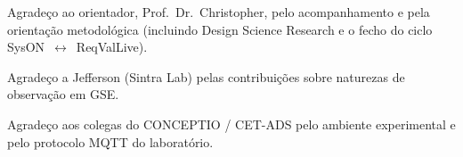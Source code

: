 Agradeço ao orientador, Prof.~Dr.~Christopher, pelo acompanhamento e pela
orientação metodológica (incluindo Design Science Research e o fecho do ciclo
SysON~$\leftrightarrow$~ReqValLive).

Agradeço a Jefferson (Sintra Lab) pelas contribuições sobre naturezas de
observação em GSE.

Agradeço aos colegas do CONCEPTIO / CET-ADS pelo ambiente experimental e pelo
protocolo MQTT do laboratório.

